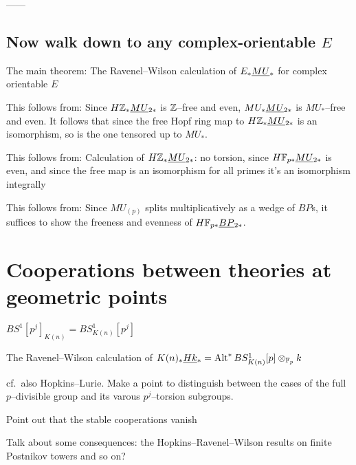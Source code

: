 
------

\subsection*{Now walk down to any complex-orientable $E$}

The main theorem: The Ravenel--Wilson calculation of $E_* \smash{\underline{MU}}_{*}$ for complex orientable $E$

This follows from: Since $H\mathbb Z_* \smash{\underline{MU}}_{2*}$ is $\mathbb Z$--free and even, $MU_* \smash{\underline{MU}}_{2*}$ is $MU_*$--free and even.  It follows that since the free Hopf ring map to $H\mathbb Z_* \smash{\underline{MU}}_{2*}$ is an isomorphism, so is the one tensored up to $MU_*$.

This follows from: Calculation of $H\mathbb Z_* \smash{\underline{MU}}_{2*}$: no torsion, since $H\mathbb F_{p*} \smash{\underline{MU}}_{2*}$ is even, and since the free map is an isomorphism for all primes it's an isomorphism integrally

This follows from: Since $MU_{(p)}$ splits multiplicatively as a wedge of $BP$s, it suffices to show the freeness and evenness of $H\mathbb F_{p*} \smash{\underline{BP}}_{2*}$.














\section{Cooperations between theories at geometric points}


$BS^1[p^j]_{K(n)} = BS^1_{K(n)}[p^j]$

The Ravenel--Wilson calculation of $K(n)_* \smash{\underline{Hk}}_{*} = \operatorname{Alt}^* BS^1_{K(n)}[p] \otimes_{\mathbb F_p} k$

cf.\ also Hopkins--Lurie.  Make a point to distinguish between the cases of the full $p$--divisible group and its varous $p^j$--torsion subgroups.

Point out that the stable cooperations vanish

Talk about some consequences: the Hopkins--Ravenel--Wilson results on finite Postnikov towers and so on?







